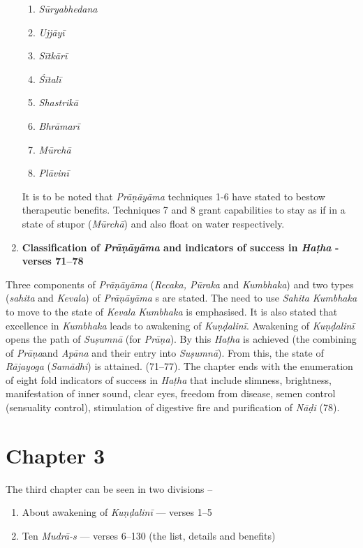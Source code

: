 \begin{enumerate}
\begin{enumerate}
\item \textit{Sūryabhedana}
\item \textit{Ujjāyī}
\item \textit{Sītkārī}
\item \textit{Śītalī}
\item \textit{Shastrikā}
\item \textit{Bhrāmarī}
\item \textit{Mūrchā}
\item \textit{Plāvinī}
\end{enumerate}

It is to be noted that \textit{Prāṇāyāma} techniques 1-6 have stated to bestow therapeutic benefits. Techniques 7 and 8 grant capabilities to stay as if in a state of stupor (\textit{Mūrchā}) and also float on water respectively.

\item \textbf{Classification of \textit{Prāṇāyāma} and indicators of success in \textit{Haṭha} - verses 71--78}
\end{enumerate}

Three components of \textit{Prāṇāyāma} (\textit{Recaka, Pūraka} and \textit{Kumbhaka}) and two types (\textit{sahita} and \textit{Kevala}) of \textit{Prāṇāyāma} s are stated. The need to use \textit{Sahita} \textit{Kumbhaka} to move to the state of \textit{Kevala} \textit{Kumbhaka} is emphasised. It is also stated that excellence in \textit{Kumbhaka} leads to awakening of \textit{Kuṇḍalinī}. Awakening of \textit{Kuṇḍalinī}  opens the path of \textit{Suṣumnā} (for \textit{Prāṇa}). By this \textit{Haṭha} is achieved (the combining of \textit{Prāṇa}and \textit{Apāna} and their entry into \textit{Suṣumnā}).  From this, the state of \textit{Rājayoga} (\textit{Samādhi}) is attained. (71--77). The chapter ends with the  enumeration of eight fold indicators of success in \textit{Haṭha} that include slimness, brightness, manifestation of inner sound, clear eyes, freedom from disease, semen control (sensuality control), stimulation of digestive fire and purification of \textit{Nāḍi} (78). 

\section*{Chapter 3}

The third chapter can be seen in two divisions –

\begin{enumerate}
\item About awakening of \textit{Kuṇḍalinī}  --- verses 1--5
\item Ten \textit{Mudrā-s} --- verses 6--130 (the list, details and benefits)
\end{enumerate}

